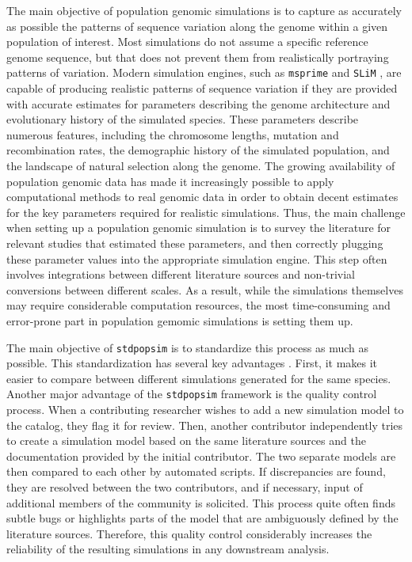 \documentclass[hidelinks]{article}
\newcommand{\stdpopsim}{\texttt{stdpopsim}\xspace}
\begin{document}
	
The main objective of population genomic simulations is to capture as accurately as possible the patterns of sequence variation along the genome within a given population of interest. Most simulations do not assume a specific reference genome sequence, but that does not prevent them from realistically portraying patterns of variation. Modern simulation engines, such as \texttt{msprime} \citep{Kelleher2016,Nelson2020} and \texttt{SLiM} \citep{Haller2019}, are capable of producing realistic patterns of sequence variation if they are provided with accurate estimates for parameters describing the genome architecture and evolutionary history of the simulated species. These parameters describe numerous features, including the chromosome lengths,  mutation and recombination rates, the demographic history of the simulated population, and the landscape of natural selection along the genome. The growing availability of population genomic data has made it increasingly possible to apply computational methods to real genomic data in order to obtain decent estimates for the key parameters required for realistic simulations. Thus, the main challenge when setting up a population genomic simulation is to survey the literature for relevant studies that estimated these parameters, and then correctly plugging these parameter values into the appropriate simulation engine. This step often involves integrations between different literature sources and non-trivial conversions between different scales. As a result, while the simulations themselves may require considerable computation resources, the most time-consuming and error-prone part in population gemomic simulations is setting them up.


The main objective of \texttt{\stdpopsim} is to standardize this process as much as possible.
This standardization has several key advantages \citep{Adrion2020}. First, it makes it easier to compare between different
simulations generated for the same species. Another major advantage of the
\texttt{\stdpopsim} framework is the quality control process.
When a contributing researcher wishes to add a new simulation model to the catalog,
they flag it for review. Then, another contributor independently tries to create a simulation model based on the same literature sources and the documentation provided by the initial contributor. The two separate models are then
compared to each other by automated scripts. If discrepancies are found, they
are resolved between the two contributors, and if necessary, input of additional members of the community is solicited. This process quite often
finds subtle bugs  \citep{Ragsdale2020} or highlights parts of the model that are
ambiguously defined by the literature sources. 
Therefore, this quality control considerably increases the reliability of the
resulting simulations in any downstream analysis.
\end{document}
